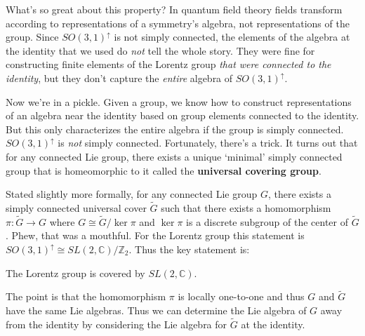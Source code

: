 What's so great about this property? In quantum field theory fields transform according to representations of a symmetry's algebra, not representations of the group. Since $SO(3,1)^\uparrow$ is not simply connected, the elements of the algebra at the identity that we used do \textit{not} tell the whole story. They were fine for constructing finite elements of the Lorentz group \textit{that were connected to the identity}, but they don't capture the \textit{entire} algebra of $SO(3,1)^\uparrow$.


Now we're in a pickle. Given a group, we know how to construct representations of an algebra near the identity based on group elements connected to the identity. But this only characterizes the entire algebra if the group is simply connected. $SO(3,1)^\uparrow$ is \textit{not} simply connected. Fortunately, there's a trick. It turns out that for any connected Lie group, there exists a unique `minimal' simply connected group that is homeomorphic to it called the \textbf{universal covering group}. 

Stated slightly more formally, for any connected Lie group $G$, there exists a simply connected universal cover $\tilde{G}$ such that there exists a homomorphism $\pi:\tilde G \to G$ where $G \cong \tilde G/\ker \pi$ and $\ker \pi$ is a discrete subgroup of the center of $\tilde G$. Phew, that was a mouthful. For the Lorentz group this statement is $SO(3,1)^\uparrow \cong SL(2,\mathbb{C})/\mathbb{Z}_2$. Thus the key statement is:
\begin{center}
The Lorentz group is covered by $SL(2,\mathbb{C})$.
\end{center}
The point is that the homomorphism $\pi$ is locally one-to-one and thus $G$ and $\tilde G$ have the same Lie algebras. Thus we can determine the Lie algebra of $G$ away from the identity by considering the  Lie algebra for $\tilde G$ at the identity.

